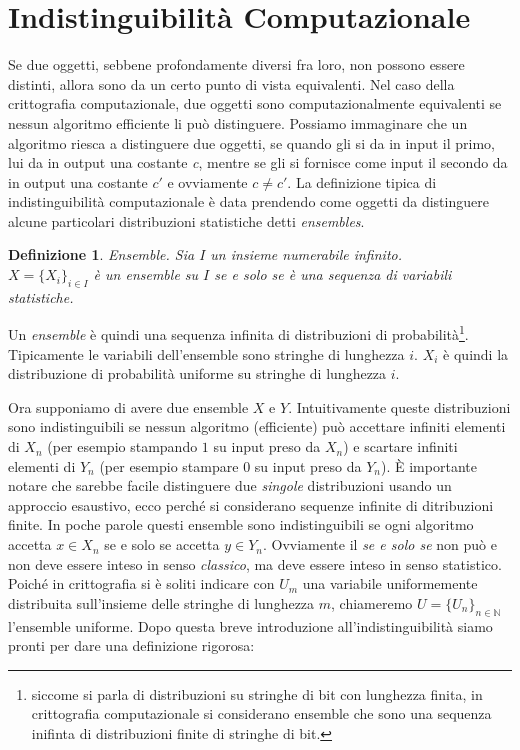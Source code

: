 \documentclass[a4paper,openright,twoside,12pt]{report}
\newtheorem{definizione}{Definizione}[chapter]
\begin{document}
\section{Indistinguibilit\`a Computazionale}
Se due oggetti, sebbene profondamente diversi fra loro, non possono essere distinti, allora sono da un certo punto di vista equivalenti.
Nel caso della crittografia computazionale, due oggetti sono computazionalmente equivalenti se nessun algoritmo efficiente li pu\`o distinguere.
Possiamo immaginare che un algoritmo riesca a distinguere due oggetti, se quando gli si da in input il primo, lui da in output una costante \emph{c}, mentre se gli si 
fornisce come input il secondo da in output una costante \emph{$c'$} e ovviamente $c \neq c'$.
La definizione tipica di indistinguibilit\`a computazionale \`e data prendendo come oggetti da distinguere alcune particolari distribuzioni statistiche detti \emph{ensembles}.

\begin{definizione}{Ensemble.}
Sia $I$ un insieme numerabile infinito.\\ $X=\{X_i\}_{i \in I}$ \`e un ensemble su $I$ se e solo se \`e una sequenza di variabili statistiche.
\end{definizione}
Un \emph{ensemble} \`e quindi una sequenza infinita di distribuzioni di probabilit\`a\footnote{siccome si parla di distribuzioni su stringhe di bit con lunghezza finita,
in crittografia computazionale si considerano ensemble che sono una sequenza inifinta di distribuzioni finite di stringhe di bit.}. 
Tipicamente le variabili dell'ensemble sono stringhe di lunghezza $i$. $X_i$ \`e quindi la distribuzione di probabilit\`a uniforme su stringhe di lunghezza $i$.

Ora supponiamo di avere due ensemble $X$ e $Y$. Intuitivamente queste distribuzioni sono indistinguibili se nessun algoritmo (efficiente) pu\`o accettare infiniti elementi di $X_n$
(per esempio stampando $1$ su input preso da $X_n$) e scartare infiniti elementi di $Y_n$ (per esempio stampare $0$ su input preso da $Y_n$). \`E importante notare che sarebbe facile 
distinguere due \emph{singole} distribuzioni usando un approccio esaustivo, ecco perch\'e si considerano sequenze infinite di ditribuzioni finite.
In poche parole questi ensemble sono indistinguibili se ogni algoritmo accetta $x \in X_n$ se e solo se accetta $y \in Y_n$. Ovviamente il \emph{se e solo se} non pu\`o e non deve
essere inteso in senso \emph{classico}, ma deve essere inteso in senso statistico. Poich\'e in crittografia si \`e soliti indicare con $U_m$ una variabile
uniformemente distribuita sull'insieme delle stringhe di lunghezza $m$, chiameremo $U=\{U_n\}_{n \in \mathbb{N}}$ l'ensemble uniforme.
Dopo questa breve introduzione all'indistinguibilit\`a siamo pronti per dare una definizione rigorosa:
\end{document}
